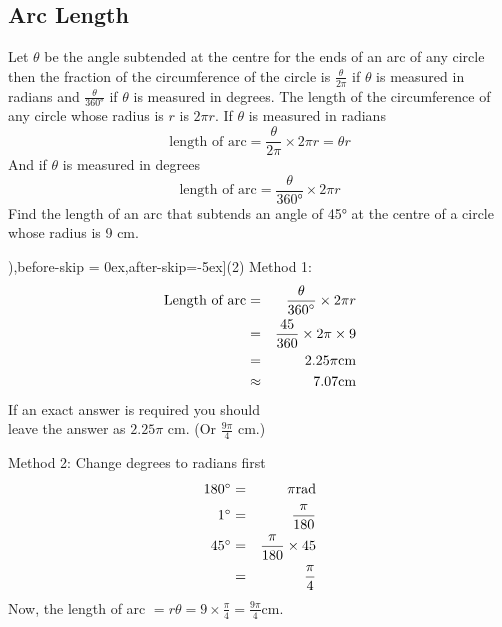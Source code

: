 \subsection*{Arc Length}
Let $\theta $ be the angle subtended at the centre for the ends of an arc of any circle then the fraction of the circumference of the circle is $\frac{\theta }{2 \pi }$ if $\theta $ is measured in radians and $\frac{\theta }{\ang{360}}$ if $\theta $ is measured in degrees. The length of the circumference of any circle whose radius is $r$ is $2 \pi  r$. If $\theta $ is measured in radians
\begin{equation*}\text{length of arc} =\frac{\theta }{2 \pi } \times 2 \pi  r =\theta  r
\end{equation*}
And if $\theta $ is measured in degrees
\begin{equation*}\text{length of arc} =\frac{\theta }{\ang{360}} \times 2 \pi  r
\end{equation*}
\example Find the length of an arc that subtends an angle of \ang{45} at the centre of a circle whose radius is 9 cm. 
\clearpage
\solution \begin{tasks}[counter-format=(tsk[1]),before-skip = {0ex},after-skip={-5ex}](2)
	\task Method 1:\begin{eqnarray*}\text{Length of arc} &  = & \frac{\theta }{360 \mbox{{\ensuremath{{}^\circ}}}} \times 2 \pi  r \\
	&  = & \frac{45}{360} \times 2 \pi  \times 9 \\
	&  = & 2.25 \pi \text{}\mbox{cm} \\
	&  \approx  & 7.07\text{}\mbox{cm}\end{eqnarray*}
If an exact answer is required you should\\ leave the answer as $2.25 \pi $ $\mbox{cm}$. (Or $\frac{9 \pi }{4}$ $\mbox{cm}\text{.}$) 

\task Method 2: Change degrees to radians first
\begin{eqnarray*}180 \mbox{{\ensuremath{{}^\circ}}} &  = & \pi \text{}\mbox{rad} \\
	1 \mbox{{\ensuremath{{}^\circ}}} &  = & \frac{\pi }{180} \\
	45 \mbox{{\ensuremath{{}^\circ}}} &  = & \frac{\pi }{180} \times 45 \\
	&  = & \frac{\pi }{4}\end{eqnarray*}
Now, the length of arc $= r \theta = 9 \times \frac{\pi }{4} =\frac{9 \pi }{4}\text{}\mbox{cm}$.
\end{tasks}
